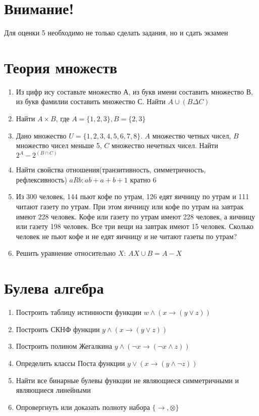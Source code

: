 \documentclass{paper}
\begin{document}
\section{Внимание!}
Для оценки 5 необходимо не только сделать задания, но и сдать экзамен
\section{Теория множеств}
\begin{enumerate}
    \item Из цифр ису составьте множество А, 
    из букв имени составить множество В, 
    из букв фамилии составить множество С. Найти $A \cup (B \Delta C)$
    \item Найти $A \times B$, где $A = \{1,2,3\}, B = \{2,3\}$
    \item Дано множество $U = \{1,2,3,4,5,6,7,8\}$. $A$ множество четных чисел, $B$ множество чисел меньше 5, $C$ множество нечетных чисел.
    Найти $2^A - 2^{(B \cap C)}$
    \item Найти свойства отношения(транзитивность, симметричность, рефлексивность) 
    $aRb: ab + a + b + 1$ кратно 6
    \item Из 300 человек, 144 пьют кофе по утрам, 126 едят яичницу по утрам и 111 читают газету по утрам.
    При этом яичницу или кофе по утрам на завтрак имеют 228 человек. 
    Кофе или газету по утрам имеют 228 человек, а яичницу или газету 198 человек.
    Все три вещи на завтрак имеют 15 человек. 
    Сколько человек не пьют кофе и не едят яичницу и не читают газеты по утрам?
    \item Решить уравнение относительно $X$: $AX \cup B = A - X$
\end{enumerate}
\section{Булева алгебра}
\begin{enumerate}
    \item Построить таблицу истинности функции $w \land (x \rightarrow (y \lor z))$
    \item Построить СКНФ функции $y \land (x \rightarrow (y \lor z))$
    \item Построить полином Жегалкина $y \land (\lnot x \rightarrow (\lnot x \land z))$
    \item Определить классы Поста функции $y \lor (x \rightarrow (y \land \lnot z))$
    \item Найти все бинарные булевы функции не являющиеся симметричными и являющиеся линейными
    \item Опровергнуть или доказать полноту набора $\{\rightarrow, \otimes\}$
\end{enumerate}
\end{document}
